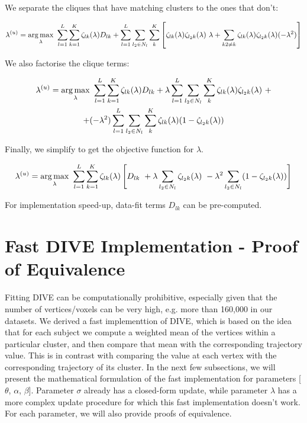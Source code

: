 We separate the cliques that have matching clusters to the ones that don't:

\begin{equation}
\lambda^{(u)} = \argmax_{\lambda}\ \sum_{l=1}^L \sum_{k=1}^K \zeta_{lk}(\lambda) D_{lk} + \sum_{l = 1}^{L} \sum_{l_2 \in N_l} \sum_{k}^K  \left[ \zeta_{lk}(\lambda) \zeta_{l_2k}(\lambda)\ \lambda + \sum_{k2 \neq k} \zeta_{lk}(\lambda) \zeta_{l_2k}(\lambda) (-\lambda^2)\right]
\end{equation}

We also factorise the clique terms:

\begin{multline}
\lambda^{(u)} = \operatorname*{arg\,max}_{\lambda}\ \sum_{l=1}^L \sum_{k=1}^K \zeta_{lk}(\lambda) D_{lk} + \lambda \sum_{l = 1}^{L} \sum_{l_2 \in N_l} \sum_{k}^K   \zeta_{lk}(\lambda) \zeta_{l_2k}(\lambda)\ + \\ + (-\lambda^2) \sum_{l = 1}^{L} \sum_{l_2 \in N_l} \sum_{k}^K \zeta_{lk}(\lambda) (1- \zeta_{l_2k}(\lambda))
\end{multline}

Finally, we simplify to get the objective function for $\lambda$.

\begin{equation}
 \lambda^{(u)} = \argmax_{\lambda}\ \sum_{l=1}^L \sum_{k=1}^K \zeta_{lk}(\lambda) \left[  D_{lk} \  + \lambda \sum_{l_2 \in N_l}  \zeta_{l_2 k}(\lambda)\  -\lambda^2 \sum_{l_2 \in N_l} (1- \zeta_{l_2 k}(\lambda))  \right]
\end{equation}

For implementation speed-up, data-fit terms $D_{lk}$ can be pre-computed.


\section{Fast DIVE Implementation - Proof of Equivalence}
\label{sec:appDivFas}

Fitting DIVE can be computationally prohibitive, especially given that the number of vertices/voxels can be very high, e.g. more than 160,000 in our datasets. We derived a fast implementtion of DIVE, which is based on the idea that for each subject we compute a weighted mean of the vertices within a particular cluster, and then compare that mean with the corresponding trajectory value. This is in contrast with comparing the value at each vertex with the corresponding trajectory of its cluster. In the next few subsections, we will present the mathematical formulation of the fast implementation for parameters [$\theta$, $\alpha$, $\beta$]. Parameter $\sigma$ already has a closed-form update, while parameter $\lambda$ has a more complex update procedure for which this fast implementation doesn't work. For each parameter, we will also provide proofs of equivalence.


